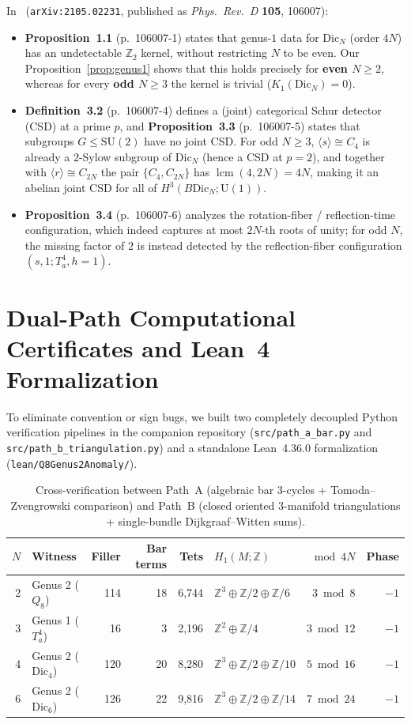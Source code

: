 \documentclass[11pt]{amsart}
\theoremstyle{definition}
\theoremstyle{remark}
\newcommand{\Z}{\mathbb{Z}}
\newcommand{\U}{\mathrm{U}}
\newcommand{\SU}{\mathrm{SU}}
\newcommand{\Dic}{\mathrm{Dic}}
\begin{document}
In~\cite{Yu2022} (\texttt{arXiv:2105.02231}, published as \emph{Phys.\ Rev.\ D} \textbf{105}, 106007):
\begin{itemize}
    \item \textbf{Proposition~1.1} (p.~106007-1) states that genus-$1$ data for $\Dic_N$ (order $4N$) has an undetectable $\Z_2$ kernel, without restricting $N$ to be even. Our Proposition~\ref{prop:genus1} shows that this holds precisely for \textbf{even $N \ge 2$}, whereas for every \textbf{odd $N \ge 3$} the kernel is trivial ($K_1(\Dic_N)=0$).
    \item \textbf{Definition~3.2} (p.~106007-4) defines a (joint) categorical Schur detector (CSD) at a prime $p$, and \textbf{Proposition~3.3} (p.~106007-5) states that subgroups $G \le \SU(2)$ have no joint CSD. For odd $N \ge 3$, $\langle s\rangle \cong C_4$ is already a $2$-Sylow subgroup of $\Dic_N$ (hence a CSD at $p=2$), and together with $\langle r\rangle \cong C_{2N}$ the pair $\{C_4, C_{2N}\}$ has $\operatorname{lcm}(4,2N)=4N$, making it an abelian joint CSD for all of $H^3(B\Dic_N;\U(1))$.
    \item \textbf{Proposition~3.4} (p.~106007-6) analyzes the rotation-fiber / reflection-time configuration, which indeed captures at most $2N$-th roots of unity; for odd $N$, the missing factor of $2$ is instead detected by the reflection-fiber configuration $(s,1;T_a^4,h=1)$.
\end{itemize}

\section{Dual-Path Computational Certificates and Lean~4 Formalization}

To eliminate convention or sign bugs, we built two completely decoupled Python verification pipelines in the companion repository (\texttt{src/path\_a\_bar.py} and \texttt{src/path\_b\_triangulation.py}) and a standalone Lean~4.36.0 formalization (\texttt{lean/Q8Genus2Anomaly/}).

\begin{table}[h]
\centering
\caption{Cross-verification between Path~A (algebraic bar $3$-cycles + Tomoda--Zvengrowski comparison) and Path~B (closed oriented $3$-manifold triangulations + single-bundle Dijkgraaf--Witten sums).}\label{tab:dualpath}
\begin{tabular}{@{}r l r r r l r r@{}}
\toprule
$N$ & Witness & Filler & Bar terms & Tets & $H_1(M;\Z)$ & $\bmod 4N$ & Phase \\
\midrule
2 & Genus 2 ($Q_8$) & 114 & 18 & 6,744 & $\Z^3\oplus\Z/2\oplus\Z/6$ & $3\bmod 8$ & $-1$ \\
3 & Genus 1 ($T_a^4$) & 16 & 3 & 2,196 & $\Z^2\oplus\Z/4$ & $3\bmod 12$ & $-1$ \\
4 & Genus 2 ($\Dic_4$) & 120 & 20 & 8,280 & $\Z^3\oplus\Z/2\oplus\Z/10$ & $5\bmod 16$ & $-1$ \\
6 & Genus 2 ($\Dic_6$) & 126 & 22 & 9,816 & $\Z^3\oplus\Z/2\oplus\Z/14$ & $7\bmod 24$ & $-1$ \\
\bottomrule
\end{tabular}
\end{table}
\end{document}

